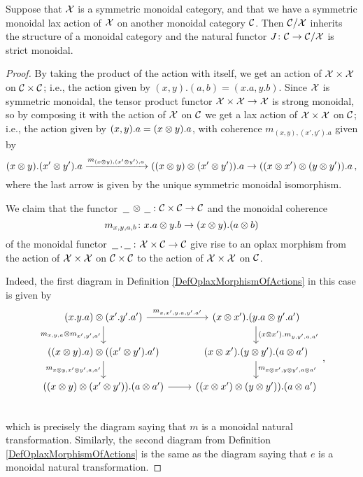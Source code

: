 \documentclass{article}
\begin{document}
\begin{proposition}
  Suppose that $\mathcal X$ is a symmetric monoidal category, and that we have a symmetric monoidal lax action of $\mathcal X$ on another monoidal category ${\mathcal{C}}$.  
  Then ${\mathcal{C}}/\mathcal X$ inherits the structure of a monoidal category and the natural functor $J\colon {\mathcal{C}} \to {\mathcal{C}}/\mathcal X$ is strict monoidal.
\end{proposition}
\begin{proof}
  By taking the product of the action with itself, we get an action of $\mathcal X\times\mathcal X$ on ${\mathcal{C}}\times{\mathcal{C}}$; i.e., the action given by $(x,y).(a,b)=(x.a,y.b)$.  
  Since $\mathcal X$ is symmetric monoidal, the tensor product functor $\mathcal X\times\mathcal X \to \mathcal X$ is strong monoidal, so by composing it with the action of $\mathcal X$ on ${\mathcal{C}}$ we get a lax action of $\mathcal X\times\mathcal X$ on ${\mathcal{C}}$; i.e., the action given by $(x,y).a = (x\otimes y).a$, with coherence $m_{(x,y),(x',y').a}$ given by
  \[
    (x\otimes y).(x'\otimes y').a \xrightarrow{m_{(x\otimes y),(x'\otimes y'),a}}
    ((x\otimes y)\otimes (x'\otimes y')).a \to
    ((x\otimes x')\otimes (y\otimes y')).a\,,
    \]
  where the last arrow is given by the unique symmetric monoidal isomorphism.

  We claim that the functor $\,\underline{\hspace{1.5ex}}\,\otimes\,\underline{\hspace{1.5ex}}\,\colon {\mathcal{C}}\times{\mathcal{C}}\to{\mathcal{C}}$ and the monoidal coherence
  \[
    m_{x,y,a,b} \colon x.a \otimes y.b \to (x\otimes y).(a\otimes b)
    \]
  of the monoidal functor $\,\underline{\hspace{1.5ex}}\,.\,\underline{\hspace{1.5ex}}\,\colon \mathcal X \times {\mathcal{C}} \to {\mathcal{C}}$ give rise to an oplax morphism from the action of $\mathcal X\times\mathcal X$ on ${\mathcal{C}}\times{\mathcal{C}}$ to the action of $\mathcal X\times\mathcal X$ on ${\mathcal{C}}$.

  Indeed, the first diagram in Definition \ref{DefOplaxMorphismOfActions} in this case is given by
  \[
    \begin{tikzcd}
      (x.y.a)\tensor(x'.y'.a') \arrow[r, "{m_{x,x',y.a,y'.a'}}"] \arrow[d, "{m_{x,y,a}\tensor m_{x',y',a'}}"']
        & (x\tensor x').(y.a \tensor y'.a') \arrow[d, "{(x\tensor x').m_{y,y',a,a'}}"] \\
      ((x\tensor y).a)\tensor ((x'\tensor y').a') \arrow[d, "{m_{x\tensor y,x'\tensor y',a,a'}}"']
        & (x \tensor x').(y\tensor y').(a \tensor a') \arrow[d, "{m_{x\tensor x',y\tensor y',a\tensor a'}}"] \\
      ((x\tensor y)\tensor (x'\tensor y')).(a\tensor a') \arrow[r]
        & ((x \tensor x')\tensor (y \tensor y')) . (a \tensor a') \\
    \end{tikzcd}\,,
    \]
  which is precisely the diagram saying that $m$ is a monoidal natural transformation.  
  Similarly, the second diagram from Definition \ref{DefOplaxMorphismOfActions} is the same as the diagram saying that $e$ is a monoidal natural transformation.  


\end{proof}
\end{document}
